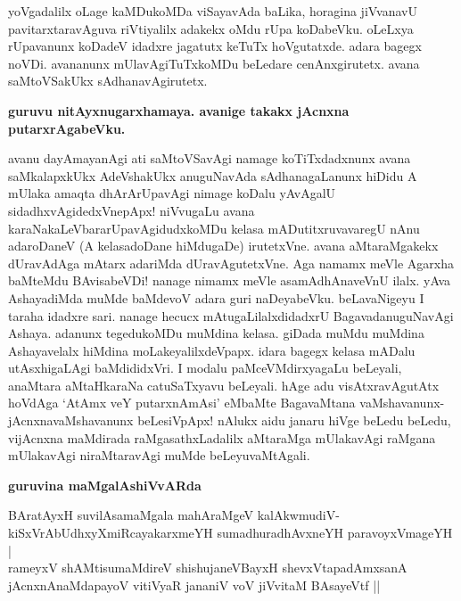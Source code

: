 yoVgadalilx oLage kaMDukoMDa viSayavAda baLika, horagina jiVvanavU pavitarxtaravAguva riVtiyalilx adakekx oMdu rUpa koDabeVku. oLeLxya rUpavanunx koDadeV idadxre jagatutx keTuTx hoVgutatxde. adara bagegx noVDi. avananunx mUlavAgiTuTxkoMDu beLedare cenAnxgirutetx. avana saMtoVSakUkx sAdhanavAgirutetx.

\newpage

{\bigskip
\noindent
{\large\bf guruvu nitAyxnugarxhamaya. avanige takakx jAcnxna putarxrAgabeVku.}}\label{page74}
\medskip

\noindent
avanu dayAmayanAgi ati saMtoVSavAgi namage koTiTxdadxnunx avana saMkalapxkUkx AdeVshakUkx anuguNavAda sAdhanagaLanunx hiDidu A mUlaka amaqta dhArArUpavAgi nimage koDalu yAvAgalU sidadhxvAgidedxVnepApx! niVvugaLu avana karaNakaLeVbararUpavAgidudxkoMDu kelasa mADutitxruvavaregU nAnu adaroDaneV (A kelasadoDane hiMdugaDe) irutetxVne. avana aMtaraMgakekx dUravAdAga mAtarx adariMda dUravAgutetxVne. Aga namamx meVle Agarxha baMteMdu BAvisabeVDi! nanage nimamx meVle asamAdhAnaveVnU ilalx. yAva AshayadiMda muMde baMdevoV adara guri naDeyabeVku. beLavaNigeyu I taraha idadxre sari. nanage hecucx mAtugaLilalxdidadxrU BagavadanuguNavAgi Ashaya. adanunx tegedukoMDu muMdina kelasa. giDada muMdu muMdina Ashayavelalx hiMdina moLakeyalilxdeVpapx. idara bagegx kelasa mADalu utAsxhigaLAgi baMdididxVri. I modalu paMceVMdirxyagaLu beLeyali, anaMtara aMtaHkaraNa catuSaTxyavu beLeyali. hAge adu visAtxravAgutAtx hoVdAga `AtAmx veY putarxnAmAsi'\label{75} eMbaMte BagavaMtana vaMshavanunx-jAcnxnavaMshavanunx beLesiVpApx! nAlukx aidu janaru hiVge beLedu beLedu, vijAcnxna maMdirada raMgasathxLadalilx aMtaraMga mUlakavAgi raMgana mUlakavAgi niraMtaravAgi muMde beLeyuvaMtAgali.

{\bigskip
\noindent
{\large\bf guruvina maMgalAshiVvARda}}\label{page75}
\medskip

\noindent
\begin{shloka}
BAratAyxH suvilAsamaMgala mahAraMgeV kalAkwmudiV-\\\label{75a}
kiSxVrAbUdhxyXmiRcayakarxmeYH sumadhuradhAvxneYH paravoyxVmageYH |\\
rameyxV shAMtisumaMdireV shishujaneVBayxH shevxVtapadAmxsanA\\
jAcnxnAnaMdapayoV vitiVyaR jananiV voV jiVvitaM BAsayeVtf ||
\end{shloka}
\medskip

